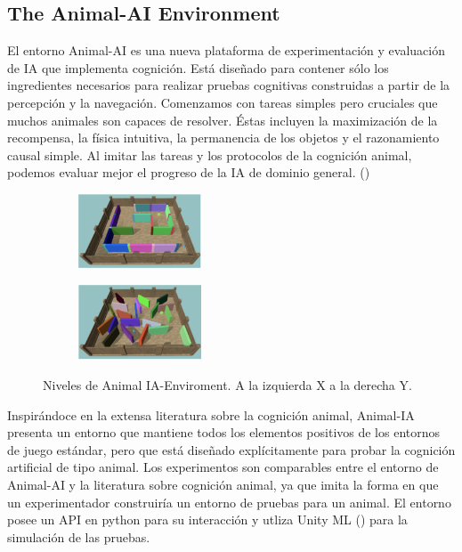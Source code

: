 \subsection{The Animal-AI Environment}

El entorno Animal-AI es una nueva plataforma de experimentación y evaluación de IA que implementa cognición. Está diseñado para contener sólo los ingredientes necesarios para realizar pruebas cognitivas construidas a partir de la percepción y la navegación. Comenzamos con tareas simples pero cruciales que muchos animales son capaces de resolver. Éstas incluyen la maximización de la recompensa, la física intuitiva, la permanencia de los objetos y el razonamiento causal simple. Al imitar las tareas y los protocolos de la cognición animal, podemos evaluar mejor el progreso de la IA de dominio general. (\cite{beyret2019animal})

\begin{figure}[ht!]
    \centering
    \begin{subfigure}
      \centering
      \includegraphics[width=0.4\textwidth]{Graphics/animal_1.png}
      \label{fig:animal1}
    \end{subfigure}%
    \begin{subfigure}
      \centering
      \includegraphics[width=0.4\textwidth]{Graphics/animal_3.png}
      \label{fig:animal2}
    \end{subfigure}%
    \caption{Niveles de Animal IA-Enviroment. A la izquierda X a la derecha Y.}
    \label{fig:animal}
\end{figure}

Inspirándoce en la extensa literatura sobre la cognición animal, Animal-IA presenta un entorno que mantiene todos los elementos positivos de los entornos de juego estándar, pero que está diseñado explícitamente para probar la cognición artificial de tipo animal. Los experimentos son comparables entre el entorno de Animal-AI y la literatura sobre cognición animal, ya que imita la forma en que un experimentador construiría un entorno de pruebas para un animal. El entorno posee un API en python para su interacción y utliza Unity ML (\cite{juliani2018unity}) para la simulación de las pruebas.

